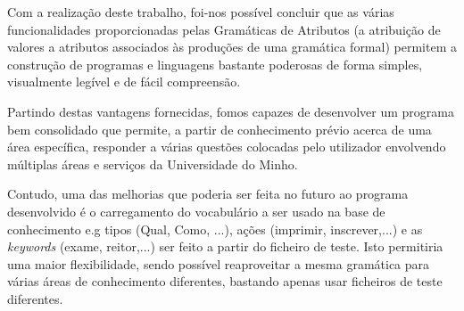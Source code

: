 \qquad
Com a realização deste trabalho, foi-nos possível concluir que as várias funcionalidades proporcionadas pelas Gramáticas de Atributos (a atribuição de valores a atributos associados às produções de uma gramática formal) permitem a construção de programas e linguagens bastante poderosas de forma simples, visualmente legível e de fácil compreensão.

Partindo destas vantagens fornecidas, fomos capazes de desenvolver um programa bem consolidado que permite, a partir de conhecimento prévio acerca de uma área específica, responder a várias questões colocadas pelo utilizador envolvendo múltiplas áreas e serviços da Universidade do Minho.

Contudo, uma das melhorias que poderia ser feita no futuro ao programa desenvolvido é o carregamento do vocabulário a ser usado na base de conhecimento e.g tipos (Qual, Como, ...), ações (imprimir, inscrever,...) e as \textit{keywords} (exame, reitor,...) ser feito a partir do ficheiro de teste. Isto permitiria uma maior flexibilidade, sendo possível reaproveitar a mesma gramática para várias áreas de conhecimento diferentes, bastando apenas usar ficheiros de teste diferentes.

